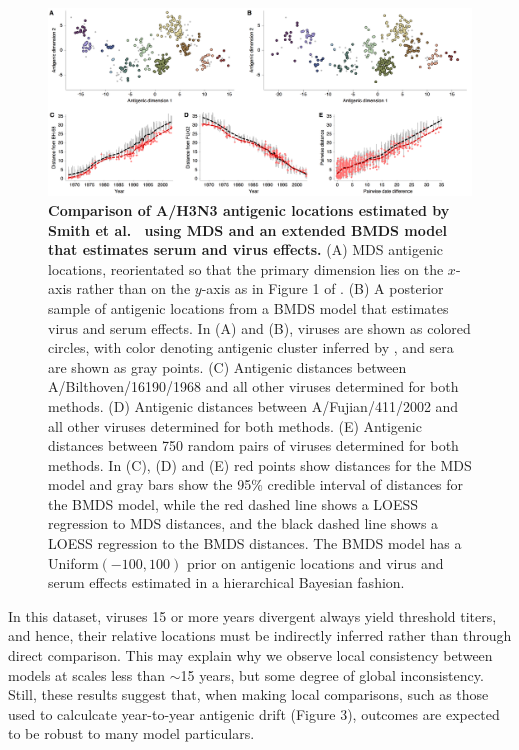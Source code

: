 \documentclass[11pt,oneside,letterpaper]{article}
\begin{document}
\begin{figure}[H]
	\centering		
	\includegraphics[width=1.0\textwidth]{figures/smith_comparison_effects}
	\caption{\textbf{Comparison of A/H3N3 antigenic locations estimated by Smith et al.\ \cite{Smith04} using MDS and an extended BMDS model that estimates serum and virus effects.} 
	(A) MDS antigenic locations, reorientated so that the primary dimension lies on the $x$-axis rather than on the $y$-axis as in Figure 1 of \cite{Smith04}.
	(B) A posterior sample of antigenic locations from a BMDS model that estimates virus and serum effects.
	In (A) and (B), viruses are shown as colored circles, with color denoting antigenic cluster inferred by \cite{Smith04}, and sera are shown as gray points.
	(C) Antigenic distances between A/Bilthoven/16190/1968 and all other viruses determined for both methods.
	(D) Antigenic distances between A/Fujian/411/2002 and all other viruses determined for both methods.
	(E) Antigenic distances between 750 random pairs of viruses determined for both methods.	
	In (C), (D) and (E) red points show distances for the MDS model and gray bars show the 95\% credible interval of distances for the BMDS model, while the red dashed line shows a LOESS regression to MDS distances, and the black dashed line shows a LOESS regression to the BMDS distances.
	The BMDS model has a Uniform$(-100,100)$ prior on antigenic locations and virus and serum effects estimated in a hierarchical Bayesian fashion. 	
	} 
	\label{smith_comparison_effects} 
\end{figure}

In this dataset, viruses 15 or more years divergent always yield threshold titers, and hence, their relative locations must be indirectly inferred rather than through direct comparison.
This may explain why we observe local consistency between models at scales less than $\sim$15 years, but some degree of global inconsistency.
Still, these results suggest that, when making local comparisons, such as those used to calculcate year-to-year antigenic drift (Figure 3), outcomes are expected to be robust to  many model particulars.



\end{document}

